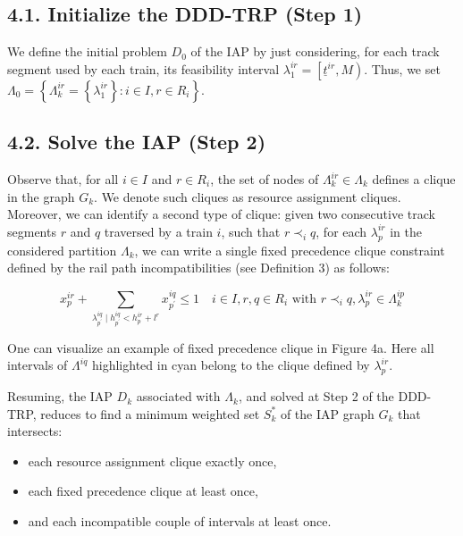 \documentclass[10pt]{article}
\begin{document}
\subsection*{4.1. Initialize the DDD-TRP (Step 1)}
We define the initial problem $D_{0}$ of the IAP by just considering, for each track segment used by each train, its feasibility interval $\lambda_{1}^{i r}=\left[\underline{t}^{i r}, M\right)$. Thus, we set $\Lambda_{0}=\left\{\Lambda_{k}^{i r}=\left\{\lambda_{1}^{i r}\right\}: i \in I, r \in R_{i}\right\}$.

\subsection*{4.2. Solve the IAP (Step 2)}
Observe that, for all $i \in I$ and $r \in R_{i}$, the set of nodes of $\Lambda_{k}^{i r} \in \Lambda_{k}$ defines a clique in the graph $G_{k}$. We denote such cliques as resource assignment cliques. Moreover, we can identify a second type of clique: given two consecutive track segments $r$ and $q$ traversed by a train $i$, such that $r \prec_{i} q$, for each $\lambda_{p}^{i r}$ in the considered partition $\Lambda_{k}$, we can write a single fixed precedence clique constraint defined by the rail path incompatibilities (see Definition 3) as follows:


\begin{equation*}
x_{p}^{i r}+\sum_{\lambda_{p^{\prime}}^{i q} \mid h_{p^{\prime}}^{i q}<h_{p}^{i r}+l^{r}} x_{p^{\prime}}^{i q} \leq 1 \quad i \in I, r, q \in R_{i} \text { with } r \prec_{i} q, \lambda_{p}^{i r} \in \Lambda_{k}^{i p} \tag{4}
\end{equation*}


One can visualize an example of fixed precedence clique in Figure 4a. Here all intervals of $\Lambda^{i q}$ highlighted in cyan belong to the clique defined by $\lambda_{p}^{i r}$.

Resuming, the IAP $D_{k}$ associated with $\Lambda_{k}$, and solved at Step 2 of the DDD-TRP, reduces to find a minimum weighted set $S_{k}^{*}$ of the IAP graph $G_{k}$ that intersects:

    \begin{itemize}
      \item each resource assignment clique exactly once,
      \item each fixed precedence clique at least once,
      \item and each incompatible couple of intervals at least once.
    \end{itemize}
\end{document}
